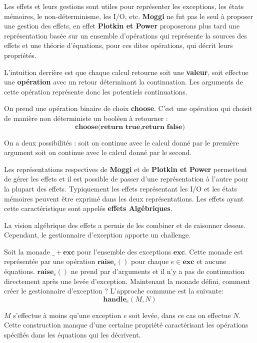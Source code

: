 	Les effets et leurs gestions sont utiles pour représenter les exceptions, les états mémoires, le non-déterminisme, les I/O, etc. \textbf{Moggi} ne fut pas le seul à proposer une gestion des effets, en effet \textbf{Plotkin et Power} proposerons plus tard une représentation basée sur un ensemble d'opérations qui représente la sources des effets et une théorie d'équations, pour ces dites opérations, qui décrit leurs propriétés.
	
	L'intuition derrière est que chaque calcul retourne soit une \textbf{valeur}, soit effectue une \textbf{opération} avec un retour déterminant la continuation. Les arguments de cette opération représente donc les potentiels continuations.
	
	\begin{exemple}
		On prend une opération binaire de choix \textbf{choose}. C'est une opération qui choisit de manière non déterministe un booléen à retourner :
		\[\textbf{choose(return true,return false)}\]
		
		On a deux possibilités : soit on continue avec le calcul donné par le première argument soit on continue avec le calcul donné par le second.
	\end{exemple}

	Les représentations respectives de \textbf{Moggi} et de \textbf{Plotkin et Power} permettent de gérer les effets et il est possible de passer d'une représentation à l'autre pour la plupart des effets. Typiquement les effets représentant les I/O et les états mémoires peuvent être exprimé dans les deux représentations. Les effets ayant cette caractéristique sont appelés \textbf{effets Algébriques}.
	\medbreak
	
	La vision algébrique des effets a permis de les combiner et de raisonner dessus. Cependant, le gestionnaire d'exception apporte un challenge.
	\smallbreak
	
	Soit la monade $\_ + \textbf{exc}$ pour l'ensemble des exceptions $\textbf{exc}$. Cette monade est représentée par une opération $\textbf{raise}_e()$ pour chaque $e \in \textbf{exc}$ et aucune équations. $\textbf{raise}_e()$ ne prend par d'arguments et il n'y a pas de continuation directement après une levée d'exception. Maintenant la monade défini, comment créer le gestionnaire d'exception ? L'approche commune est la suivante:
	\[\textbf{handle}_e(M,N)\]
		
	$M$ s'effectue à moins qu'une exception $e$ soit levée, dans ce cas on effectue $N$. Cette construction manque d'une certaine propriété caractérisant les opérations spécifiés dans les équations qui les décrivent.


